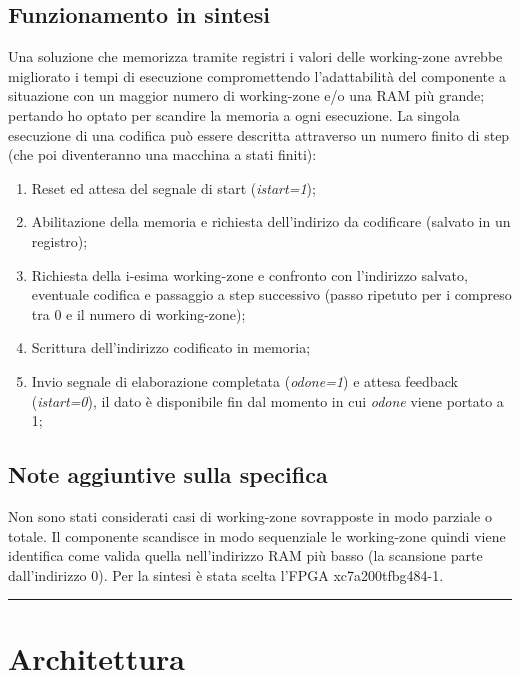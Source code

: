 \documentclass{article}
\begin{document}
\subsection{Funzionamento in sintesi}
Una soluzione che memorizza tramite registri i valori delle working-zone avrebbe migliorato i tempi di esecuzione compromettendo l'adattabilità del componente a situazione con un maggior numero di working-zone e/o una RAM più grande; pertando ho optato per scandire la memoria a ogni esecuzione.
La singola esecuzione di una codifica può essere descritta attraverso un numero finito di step (che poi diventeranno una macchina a stati finiti):
\begin{enumerate}
	\item Reset ed attesa del segnale di start (\textit{i\textunderscore start=1});
	\item Abilitazione della memoria e richiesta dell'indirizo da codificare (salvato in un registro);
	\item Richiesta della i-esima working-zone e confronto con l'indirizzo salvato, eventuale codifica e passaggio a step successivo (passo ripetuto per i compreso tra 0 e il numero di working-zone);
	\item Scrittura dell'indirizzo codificato in memoria;
	\item Invio segnale di elaborazione completata (\textit{o\textunderscore done=1}) e attesa feedback (\textit{i\textunderscore start=0}), il dato è disponibile fin dal momento in cui \textit{o\textunderscore done} viene portato a 1;
\end{enumerate}
\subsection{Note aggiuntive sulla specifica}
Non sono stati considerati casi di working-zone sovrapposte in modo parziale o totale. Il componente scandisce in modo sequenziale le working-zone quindi viene identifica come valida quella nell'indirizzo RAM più basso (la scansione parte dall'indirizzo 0).
Per la sintesi è stata scelta l'FPGA xc7a200tfbg484-1.

\noindent\rule{\textwidth}{0.5pt}
\newpage
\section{Architettura}
\end{document}
